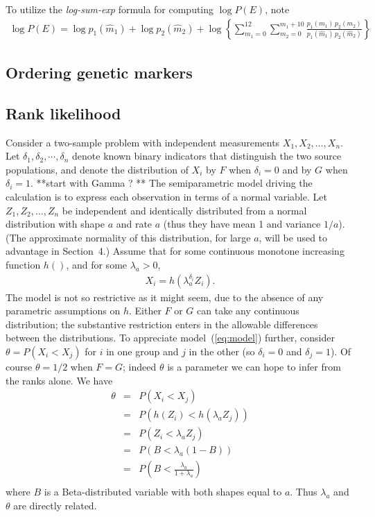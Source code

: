 To utilize the {\em log-sum-exp} formula for computing $\log P(E)$, 
note
\begin{eqnarray*}
\log P(E) = \log p_1(\hat m_1) + \log p_2( \hat m_2 )
  + \log \left\{
     \sum_{m_1 = 0}^{12} \sum_{m_2=0}^{m_1+10}
     \frac{ p_1(m_1) \, p_2(m_2)  }{ p_1( \hat m_1 ) \, p_2 (\hat m_2 ) }
    \right\}
\end{eqnarray*}

\subsection{Ordering genetic markers}

\subsection{Rank likelihood}
 

Consider a two-sample problem with independent measurements
 $X_1, X_2, \ldots, X_n$.  Let $\delta_1, \delta_2, \cdots, \delta_n$ 
 denote known binary indicators that distinguish the two source populations,
 and denote 
 the distribution of $X_i$ by $F$ when $\delta_i=0$ and by $G$ when 
 $\delta_i=1$.
 **start with Gamma ? **
 The semiparametric model driving the calculation is to express each observation
 in terms of a normal variable.  Let $Z_1, Z_2, \ldots, Z_n$
 be independent and identically distributed from a normal distribution with
 shape $a$ and rate $a$ (thus they have mean 1 and variance $1/a$).  (The
 approximate normality of this distribution, for large $a$, will be used
 to advantage in Section~4.)  
 Assume that for some continuous monotone increasing function $h()$, and
 for some $\lambda_a > 0 $,
 \begin{eqnarray}
\label{eq:model}
  X_i = h\left( \lambda_a^{ \delta_i } Z_i \right).
 \end{eqnarray}
The model is not so restrictive as it might seem, due to the absence
of any parametric assumptions on $h$.  Either $F$ or $G$ can take any
continuous distribution; the substantive restriction enters in the allowable
differences between the distributions.  To appreciate model~(\ref{eq:model}) 
further, consider $\theta = P( X_i < X_j )$ for $i$ in one group and $j$ in the other
(so $\delta_i=0$ and $\delta_j=1$).  Of course $\theta= 1/2$ when $F=G$; indeed
 $\theta$ is a parameter we can hope to infer from the ranks alone. We have
\begin{eqnarray}
\label{eq:theta}
 \theta &=& P(X_i < X_j) \\ \nonumber
        &=& P\left( h( Z_i ) < h( \lambda_a Z_j )    \right) \\ \nonumber
         &=& P\left( Z_i < \lambda_a Z_j \right) \\ \nonumber
         &=& P\left(  B < \lambda_a (1-B) \right) \\ \nonumber
         &=& P\left( B <  \frac{ \lambda_a }{ 1 + \lambda_a } \right) \\ \nonumber
\end{eqnarray}
where $B$ is a Beta-distributed variable with both shapes equal to $a$.
Thus  $\lambda_a$ and $\theta$ are directly related.

